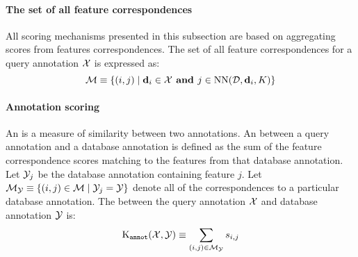         \paragraph{The set of all feature correspondences}
        All scoring mechanisms presented in this subsection are based
          on aggregating scores from features correspondences.
        The set of all feature correspondences for a query annotation
          $\mathcal{X}$ is expressed as:
        \begin{equation}
            \mathcal{M} \equiv \{(i, j) \mid \mathbf{d}_i \in \mathcal{X} \textbf{ and } j \in \operatorname{NN}(\mathcal{D}, \mathbf{d}_i, K)\}
        \end{equation}

        \paragraph{Annotation scoring}
            An \annotscore{} is a measure of similarity between two
              annotations.
            An \annotscore{} between a query annotation and a database
              annotation is defined as the sum of the feature
              correspondence scores matching to the features from that
              database annotation.
            Let $\mathcal{Y}_j$ be the database annotation containing feature
              $j$.
            Let
            $\mathcal{M}_{\mathcal{Y}} \equiv \left\{(i, j) \in \mathcal{M} \mid
              \mathcal{Y}_j = \mathcal{Y}\right\}$
            denote all of the correspondences to a particular database
              annotation.
            The \annotscore{} between the query annotation $\mathcal{X}$ and
              database annotation $\mathcal{Y}$ is:
            \begin{equation}
                \operatorname{K_{\tt annot}}(\mathcal{X}, \mathcal{Y}) \equiv \sum_{(i, j) \in \mathcal{M}_{\mathcal{Y}}} s_{i, j}
            \end{equation}

